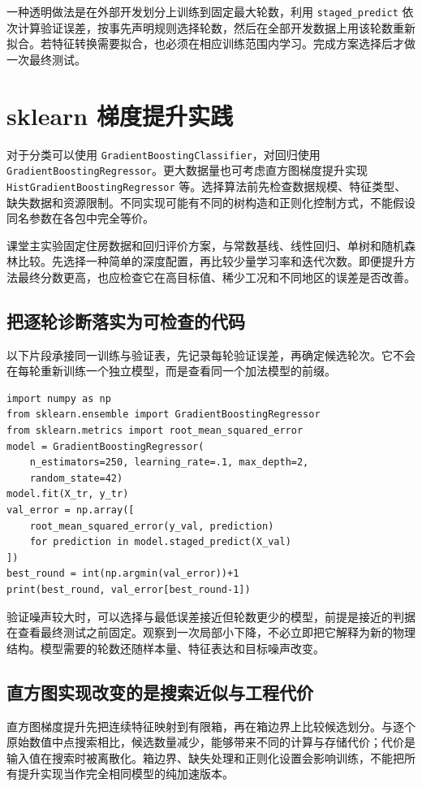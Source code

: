 一种透明做法是在外部开发划分上训练到固定最大轮数，利用 \texttt{staged\_predict} 依次计算验证误差，按事先声明规则选择轮数，然后在全部开发数据上用该轮数重新拟合。若特征转换需要拟合，也必须在相应训练范围内学习。完成方案选择后才做一次最终测试。

\section{sklearn 梯度提升实践}
对于分类可以使用 \texttt{GradientBoostingClassifier}，对回归使用 \texttt{GradientBoostingRegressor}。更大数据量也可考虑直方图梯度提升实现 \texttt{HistGradientBoostingRegressor} 等。选择算法前先检查数据规模、特征类型、缺失数据和资源限制。不同实现可能有不同的树构造和正则化控制方式，不能假设同名参数在各包中完全等价。

课堂主实验固定住房数据和回归评价方案，与常数基线、线性回归、单树和随机森林比较。先选择一种简单的深度配置，再比较少量学习率和迭代次数。即便提升方法最终分数更高，也应检查它在高目标值、稀少工况和不同地区的误差是否改善。

\subsection{把逐轮诊断落实为可检查的代码}
以下片段承接同一训练与验证表，先记录每轮验证误差，再确定候选轮次。它不会在每轮重新训练一个独立模型，而是查看同一个加法模型的前缀。
\begin{lstlisting}[caption={在开发验证集上选择轮数，并明确这是调参}]
import numpy as np
from sklearn.ensemble import GradientBoostingRegressor
from sklearn.metrics import root_mean_squared_error
model = GradientBoostingRegressor(
    n_estimators=250, learning_rate=.1, max_depth=2,
    random_state=42)
model.fit(X_tr, y_tr)
val_error = np.array([
    root_mean_squared_error(y_val, prediction)
    for prediction in model.staged_predict(X_val)
])
best_round = int(np.argmin(val_error))+1
print(best_round, val_error[best_round-1])
\end{lstlisting}

验证噪声较大时，可以选择与最低误差接近但轮数更少的模型，前提是接近的判据在查看最终测试之前固定。观察到一次局部小下降，不必立即把它解释为新的物理结构。模型需要的轮数还随样本量、特征表达和目标噪声改变。

\subsection{直方图实现改变的是搜索近似与工程代价}
直方图梯度提升先把连续特征映射到有限箱，再在箱边界上比较候选划分。与逐个原始数值中点搜索相比，候选数量减少，能够带来不同的计算与存储代价；代价是输入值在搜索时被离散化。箱边界、缺失处理和正则化设置会影响训练，不能把所有提升实现当作完全相同模型的纯加速版本。

